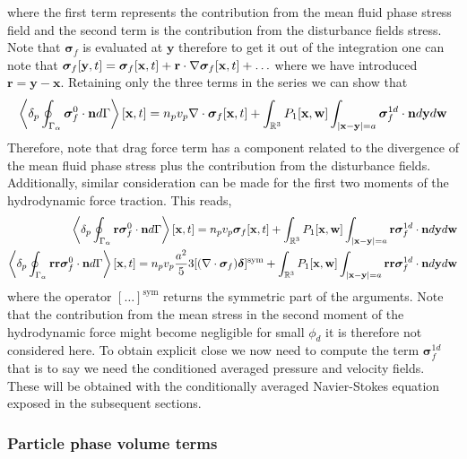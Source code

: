 where the first term represents the contribution from the mean fluid phase stress field and the second term is the contribution from the disturbance fields stress. 
Note that $\bm\sigma_f$ is evaluated at $\textbf{y}$ therefore to get it out of the integration one can note that $\bm\sigma_f[\textbf{y},t] = \bm\sigma_f[\textbf{x},t] + \textbf{r}\cdot \mathbf{\nabla}\bm\sigma_f[\textbf{x},t]+ \ldots$
where we have introduced $\textbf{r} = \textbf{y} - \textbf{x}$. 
Retaining only the three terms in the series we can show that 
\begin{equation}
    \pSavg{\bm\sigma_f^0\cdot\textbf{n}}[\textbf{x},t]
    =
    n_p v_p 
    \div\bm\sigma_f[\textbf{x},t]
    +
    \int_{\mathbb{R}^3}
    P_1[\textbf{x},\textbf{w}]
    \int_{|\textbf{x}-\textbf{y}|=a}
    \bm\sigma_f^{1d} \cdot \textbf{n}
    d\textbf{y}d\textbf{w}
    \label{eq:drag_final}
\end{equation}
Therefore, note that drag force term has a component related to the divergence of the mean fluid phase stress plus the contribution from the disturbance fields. 
Additionally, similar consideration can be made for the first two moments of the hydrodynamic force traction. 
This reads,
\begin{align}
    \pSavg{\textbf{r}\bm\sigma_f^0\cdot\textbf{n}}[\textbf{x},t]
    =
    n_p v_p \bm\sigma_f[\textbf{x},t]
    +
    \int_{\mathbb{R}^3}
    P_1[\textbf{x},\textbf{w}]
    \int_{|\textbf{x}-\textbf{y}|=a}
    \textbf{r}\bm\sigma_f^{1d} \cdot \textbf{n}
    d\textbf{y}
    d\textbf{w}
    \\
    \pSavg{\textbf{rr}\bm\sigma_f^0\cdot\textbf{n}}[\textbf{x},t]
    =
    n_pv_p  \frac{a^2}{5} 3 [(\div \bm\sigma_f)\bm\delta]^\text{sym}
    +
    \int_{\mathbb{R}^3}
    P_1[\textbf{x},\textbf{w}]
    \int_{|\textbf{x}-\textbf{y}|=a}
    \textbf{rr}\bm\sigma_f^{1d} \cdot \textbf{n}
    d\textbf{y}
    d\textbf{w}
    \label{eq:second_mom_general}
\end{align}
where the operator $[\ldots]^\text{sym}$ returns the symmetric part of the arguments.
Note that the contribution from the mean stress in the second moment of the hydrodynamic force might become negligible for small $\phi_d$ it is therefore not considered here. 
To obtain explicit close we now need to compute the term $\bm\sigma^{1d}_f$ that is to say we need the conditioned averaged pressure and velocity fields.  
These will be obtained with the conditionally averaged Navier-Stokes equation exposed in the subsequent sections. 

\subsubsection{Particle phase volume terms}

